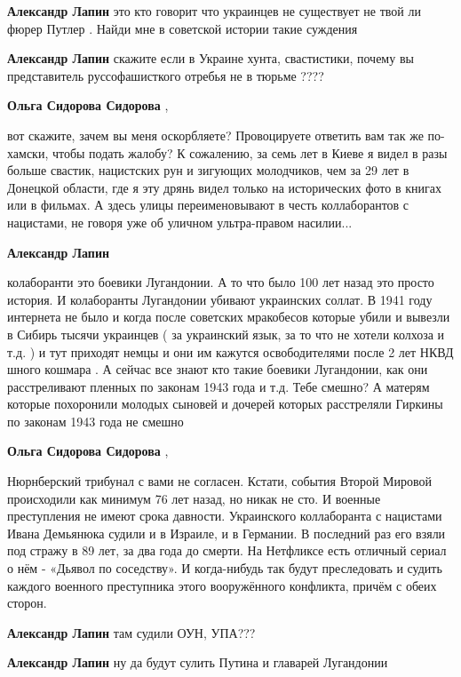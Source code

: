 \begin{itemize}
\begin{itemize}
\textbf{Александр Лапин} это кто говорит что украинцев не существует не твой ли фюрер Путлер . Найди мне в советской истории такие суждения

\textbf{Александр Лапин} скажите если в Украине хунта, свастистики, почему вы представитель руссофашисткого отребья не в тюрьме ????

\textbf{Ольга Сидорова Сидорова} , 

вот скажите, зачем вы меня оскорбляете? Провоцируете ответить вам так же
по-хамски, чтобы подать жалобу? К сожалению, за семь лет в Киеве я видел в разы
больше свастик, нацистских рун и зигующих молодчиков, чем за 29 лет в Донецкой
области, где я эту дрянь видел только на исторических фото в книгах или в
фильмах. А здесь улицы переименовывают в честь коллаборантов с нацистами, не
говоря уже об уличном ультра-правом насилии...

\textbf{Александр Лапин} 

колаборанти это боевики Лугандонии. А то что было 100 лет назад это просто
история. И колаборанты Лугандонии убивают украинских соллат. В 1941 году
интернета не было и когда после советских мракобесов которые убили и вывезли в
Сибирь тысячи украинцев ( за украинский язык, за то что не хотели колхоза и
т.д. ) и тут приходят немцы и они им кажутся освободителями после 2 лет НКВД
шного кошмара . А сейчас все знают кто такие боевики Лугандонии, как они
расстреливают пленных по законам 1943 года и т.д. Тебе смешно? А матерям
которые похоронили молодых сыновей и дочерей которых расстреляли Гиркины по
законам 1943 года не смешно

\textbf{Ольга Сидорова Сидорова} , 

Нюрнберский трибунал с вами не согласен. Кстати, события Второй Мировой
происходили как минимум 76 лет назад, но никак не сто. И военные преступления
не имеют срока давности. Украинского коллаборанта с нацистами Ивана Демьянюка
судили и в Израиле, и в Германии. В последний раз его взяли под стражу в 89
лет, за два года до смерти. На Нетфликсе есть отличный сериал о нём - «Дьявол
по соседству». И когда-нибудь так будут преследовать и судить каждого военного
преступника этого вооружённого конфликта, причём с обеих сторон.


\textbf{Александр Лапин} там судили ОУН, УПА???

\textbf{Александр Лапин} ну да будут сулить Путина и главарей Лугандонии


\end{itemize}
\end{itemize}
